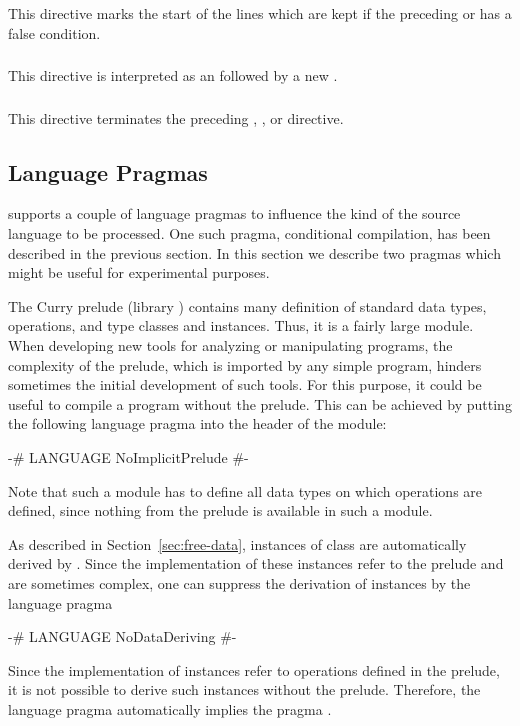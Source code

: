 This directive marks the start of the lines which are kept
if the preceding  or  has a false condition.

\subsubsection*{}

This directive is interpreted as an  followed by
a new .

\subsubsection*{}

This directive terminates the preceding
, , or  directive.


\subsection{Language Pragmas}

\CYS supports a couple of language pragmas
to influence the kind of the source language to be processed.
One such pragma, conditional compilation, has been described
in the previous section.
In this section we describe two pragmas which might be useful
for experimental purposes.

The Curry prelude (library ) contains
many definition of standard data types, operations,
and type classes and instances.
Thus, it is a fairly large module.
When developing new tools for analyzing or manipulating programs,
the complexity of the prelude, which is imported by any simple program,
hinders sometimes the initial development of such tools.
For this purpose, it could be useful to compile a program without
the prelude.
This can be achieved by putting the following language pragma
into the  header of the module:
%
\begin{curry}
{-# LANGUAGE NoImplicitPrelude #-}
\end{curry}
%
Note that such a module has to define all data types
on which operations are defined, since nothing from the prelude
is available in such a module.

As described in Section~\ref{sec:free-data},
instances of class  are automatically derived by \CYS.
Since the implementation of these instances refer to the prelude
and are sometimes complex, one can suppress the derivation
of  instances by the language pragma
%
\begin{curry}
{-# LANGUAGE NoDataDeriving #-}
\end{curry}
%
Since the implementation of  instances refer
to operations defined in the prelude, it is not possible
to derive such instances without the prelude.
Therefore, the language pragma 
automatically implies the pragma .

